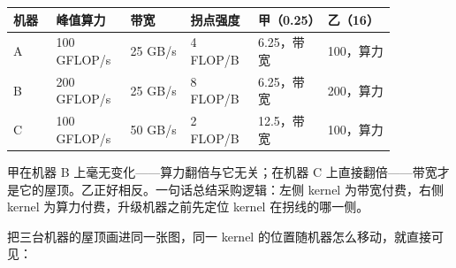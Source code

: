 \begin{longtable}{L{0.10\linewidth}L{0.16\linewidth}L{0.14\linewidth}L{0.14\linewidth}L{0.16\linewidth}L{0.16\linewidth}}
\toprule
机器 & 峰值算力 & 带宽 & 拐点强度 & 甲（0.25） & 乙（16） \\
\midrule
A & 100 GFLOP/s & 25 GB/s & 4 FLOP/B & 6.25，带宽 & 100，算力 \\
B & 200 GFLOP/s & 25 GB/s & 8 FLOP/B & 6.25，带宽 & 200，算力 \\
C & 100 GFLOP/s & 50 GB/s & 2 FLOP/B & 12.5，带宽 & 100，算力 \\
\bottomrule
\end{longtable}

甲在机器 B 上毫无变化——算力翻倍与它无关；在机器 C 上直接翻倍——带宽才是它的屋顶。乙正好相反。一句话总结采购逻辑：左侧 kernel 为带宽付费，右侧 kernel 为算力付费，升级机器之前先定位 kernel 在拐线的哪一侧。

把三台机器的屋顶画进同一张图，同一 kernel 的位置随机器怎么移动，就直接可见：

